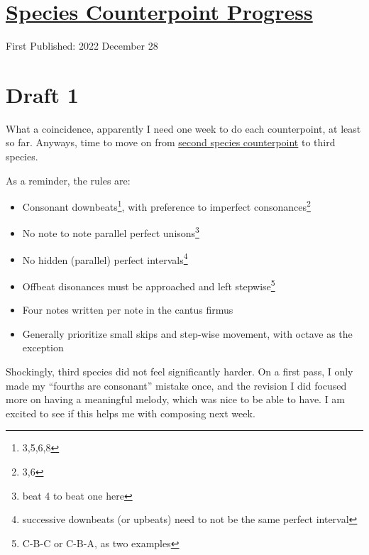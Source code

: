 \documentclass[12pt]{article}[titlepage]
\newcommand{\say}[1]{``#1''}
\newcommand{\1}{\={a}}
\newcommand{\2}{\={e}}
\newcommand{\3}{\={\i}}
\newcommand{\4}{\=o}
\newcommand{\5}{\=u}
\newcommand{\6}{\={A}}
\renewcommand{\,}{\textsuperscript{,}}
\begin{document}
\doublespacing
\section{\href{species-counterpoint-3.html}{Species Counterpoint Progress}}
First Published: 2022 December 28

\section{Draft 1}
What a coincidence, apparently I need one week to do each counterpoint, at least so far.
Anyways, time to move on from \href{species-counterpoint-2.html}{second species counterpoint} to third species.

As a reminder, the rules are:
\begin{itemize}
\item Consonant downbeats\footnote{3,5,6,8}, with preference to imperfect consonances\footnote{3,6}
\item No note to note parallel perfect unisons\footnote{beat 4 to beat one here}
\item No hidden (parallel) perfect intervals\footnote{successive downbeats (or upbeats) need to not be the same perfect interval}
\item Offbeat disonances must be approached and left stepwise\footnote{C-B-C or C-B-A, as two examples}
\item Four notes written per note in the cantus firmus
\item Generally prioritize small skips and step-wise movement, with octave as the exception
\end{itemize}

Shockingly, third species did not feel significantly harder.
On a first pass, I only made my \say{fourths are consonant} mistake once, and the revision I did focused more on having a meaningful melody, which was nice to be able to have.
I am excited to see if this helps me with composing next week.
\end{document}
